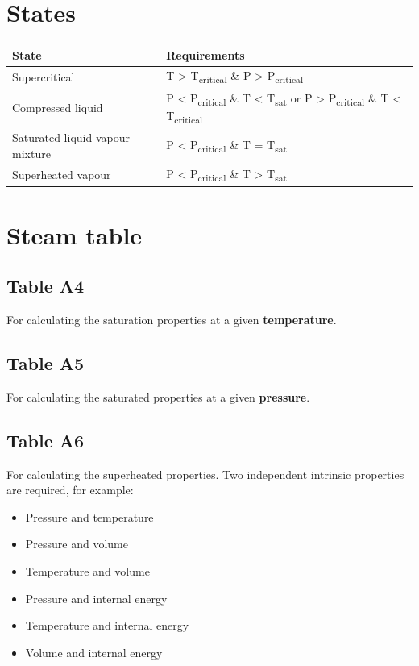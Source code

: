 \documentclass[11pt]{article}
\begin{document}
\section{States}
\label{sec:org6cb98e2}
\begin{center}
\begin{tabular}{l|l}
State & Requirements\\
\hline
Supercritical & T > T\textsubscript{critical} \& P > P\textsubscript{critical}\\
Compressed liquid & P < P\textsubscript{critical} \& T < T\textsubscript{sat} or P > P\textsubscript{critical} \& T < T\textsubscript{critical}\\
Saturated liquid-vapour mixture & P < P\textsubscript{critical} \& T = T\textsubscript{sat}\\
Superheated vapour & P < P\textsubscript{critical} \& T > T\textsubscript{sat}\\
\end{tabular}
\end{center}

\newpage
\section{Steam table}
\label{sec:orge6b2f93}

\subsection{Table A4}
\label{sec:orgb442f6a}
For calculating the saturation properties at a given \textbf{temperature}.
\subsection{Table A5}
\label{sec:orgde08e16}
For calculating the saturated properties at a given \textbf{pressure}.
\subsection{Table A6}
\label{sec:org65c0f58}
For calculating the superheated properties. Two independent intrinsic properties are required, for example:
\begin{itemize}
\item Pressure and temperature
\item Pressure and volume
\item Temperature and volume
\item Pressure and internal energy
\item Temperature and internal energy
\item Volume and internal energy
\end{itemize}
\end{document}
